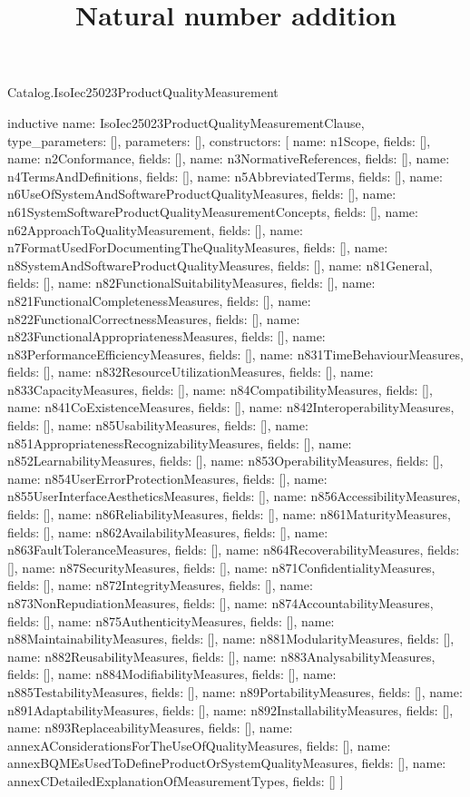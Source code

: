 \begin{lexlean}{Catalog.IsoIec25023ProductQualityMeasurement}
\title{Natural number addition}
\begin{semanticmodule}
inductive{
  name: IsoIec25023ProductQualityMeasurementClause,
  type_parameters: [],
  parameters: [],
  constructors: [
    {name: n1Scope, fields: []},
    {name: n2Conformance, fields: []},
    {name: n3NormativeReferences, fields: []},
    {name: n4TermsAndDefinitions, fields: []},
    {name: n5AbbreviatedTerms, fields: []},
    {name: n6UseOfSystemAndSoftwareProductQualityMeasures, fields: []},
    {name: n61SystemSoftwareProductQualityMeasurementConcepts, fields: []},
    {name: n62ApproachToQualityMeasurement, fields: []},
    {name: n7FormatUsedForDocumentingTheQualityMeasures, fields: []},
    {name: n8SystemAndSoftwareProductQualityMeasures, fields: []},
    {name: n81General, fields: []},
    {name: n82FunctionalSuitabilityMeasures, fields: []},
    {name: n821FunctionalCompletenessMeasures, fields: []},
    {name: n822FunctionalCorrectnessMeasures, fields: []},
    {name: n823FunctionalAppropriatenessMeasures, fields: []},
    {name: n83PerformanceEfficiencyMeasures, fields: []},
    {name: n831TimeBehaviourMeasures, fields: []},
    {name: n832ResourceUtilizationMeasures, fields: []},
    {name: n833CapacityMeasures, fields: []},
    {name: n84CompatibilityMeasures, fields: []},
    {name: n841CoExistenceMeasures, fields: []},
    {name: n842InteroperabilityMeasures, fields: []},
    {name: n85UsabilityMeasures, fields: []},
    {name: n851AppropriatenessRecognizabilityMeasures, fields: []},
    {name: n852LearnabilityMeasures, fields: []},
    {name: n853OperabilityMeasures, fields: []},
    {name: n854UserErrorProtectionMeasures, fields: []},
    {name: n855UserInterfaceAestheticsMeasures, fields: []},
    {name: n856AccessibilityMeasures, fields: []},
    {name: n86ReliabilityMeasures, fields: []},
    {name: n861MaturityMeasures, fields: []},
    {name: n862AvailabilityMeasures, fields: []},
    {name: n863FaultToleranceMeasures, fields: []},
    {name: n864RecoverabilityMeasures, fields: []},
    {name: n87SecurityMeasures, fields: []},
    {name: n871ConfidentialityMeasures, fields: []},
    {name: n872IntegrityMeasures, fields: []},
    {name: n873NonRepudiationMeasures, fields: []},
    {name: n874AccountabilityMeasures, fields: []},
    {name: n875AuthenticityMeasures, fields: []},
    {name: n88MaintainabilityMeasures, fields: []},
    {name: n881ModularityMeasures, fields: []},
    {name: n882ReusabilityMeasures, fields: []},
    {name: n883AnalysabilityMeasures, fields: []},
    {name: n884ModifiabilityMeasures, fields: []},
    {name: n885TestabilityMeasures, fields: []},
    {name: n89PortabilityMeasures, fields: []},
    {name: n891AdaptabilityMeasures, fields: []},
    {name: n892InstallabilityMeasures, fields: []},
    {name: n893ReplaceabilityMeasures, fields: []},
    {name: annexAConsiderationsForTheUseOfQualityMeasures, fields: []},
    {name: annexBQMEsUsedToDefineProductOrSystemQualityMeasures, fields: []},
    {name: annexCDetailedExplanationOfMeasurementTypes, fields: []}
  ]
}


\end{semanticmodule}
\end{lexlean}
